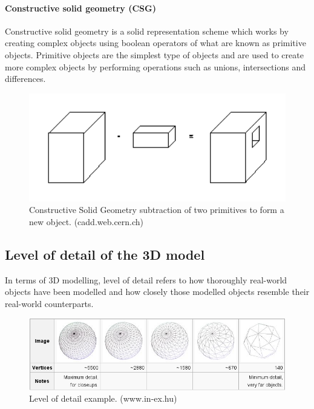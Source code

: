 \documentclass[11pt,a4paper]{report}
\begin{document}
				\paragraph{Constructive solid geometry (CSG)}
					Constructive solid geometry is a solid representation scheme which works by creating complex objects using boolean operators of what are known as primitive objects. Primitive objects are the simplest type of objects and are used to create more complex objects by performing operations such as unions, intersections and differences.
					\parencite{foley_computer_1996}
					\begin{figure}[H]
						\centering
						\includegraphics[width=1\textwidth]{csg}
						\caption[Constructive Solid Geometry]{Constructive Solid Geometry subtraction of two primitives to form a new object. (cadd.web.cern.ch)}
					\end{figure}
				
		\subsection{Level of detail of the 3D model}
			In terms of 3D modelling, level of detail refers to how thoroughly real-world objects have been modelled and how closely those modelled objects resemble their real-world counterparts.
			
			\begin{figure}[H]
				\centering
				\includegraphics[width=1\textwidth]{level_of_detail_example}
				\caption[Level of detail]{Level of detail example. (www.in-ex.hu)}
				\label{fig:lod}
			\end{figure}
			
\end{document}
